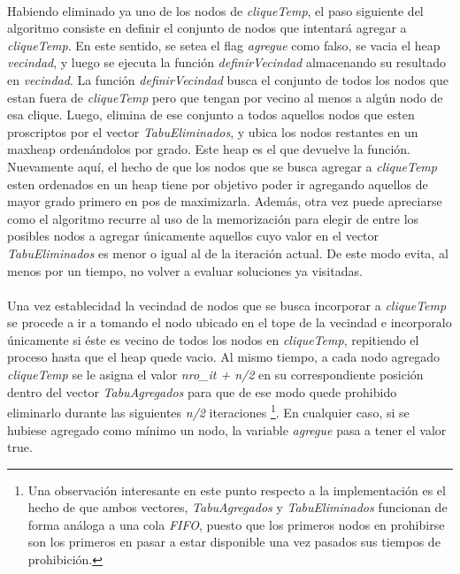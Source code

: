 \paragraph{}
Habiendo eliminado ya uno de los nodos de \textit{cliqueTemp}, el paso siguiente del algoritmo consiste en definir el conjunto de nodos que intentará agregar a \textit{cliqueTemp}. En este sentido, se setea el flag \textit{agregue} como falso, se vacia el heap \textit{vecindad}, y luego se ejecuta la función \textit{definirVecindad} almacenando su resultado en \textit{vecindad}. La función \textit{definirVecindad} busca el conjunto de todos los nodos que estan fuera de \textit{cliqueTemp} pero que tengan por vecino al menos a algún nodo de esa clique. Luego, elimina de ese conjunto a todos aquellos nodos que esten proscriptos por el vector \textit{TabuEliminados}, y ubica los nodos restantes en un maxheap ordenándolos por grado. Este heap es el que devuelve la función. \\
Nuevamente aquí, el hecho de que los nodos que se busca agregar a \textit{cliqueTemp} esten ordenados en un heap tiene por objetivo poder ir agregando aquellos de mayor grado primero en pos de maximizarla. Además, otra vez puede apreciarse como el algoritmo recurre al uso de la memorización para elegir de entre los posibles nodos a agregar únicamente aquellos cuyo valor en el vector \textit{TabuEliminados} es menor o igual al de la iteración actual. De este modo evita, al menos por un tiempo, no volver a evaluar soluciones ya visitadas.

\paragraph{}
Una vez establecidad la vecindad de nodos que se busca incorporar a \textit{cliqueTemp} se procede a ir a tomando el nodo ubicado en el tope de la vecindad e incorporalo únicamente si éste es vecino de todos los nodos en \textit{cliqueTemp}, repitiendo el proceso hasta que el heap quede vacio. Al mismo tiempo, a cada nodo agregado \textit{cliqueTemp} se le asigna el valor \textit{nro\_it + n/2} en su correspondiente posición dentro del vector \textit{TabuAgregados} para que de ese modo quede prohibido eliminarlo durante las siguientes \textit{n/2} iteraciones \footnote{Una observación interesante en este punto respecto a la implementación es el hecho de que ambos vectores, \textit{TabuAgregados} y \textit{TabuEliminados} funcionan de forma análoga a una cola \textit{FIFO}, puesto que los primeros nodos en prohibirse son los primeros en pasar a estar disponible una vez pasados sus tiempos de prohibición.}. En cualquier caso, si se hubiese agregado como mínimo un nodo, la variable \textit{agregue} pasa a tener el valor true.

